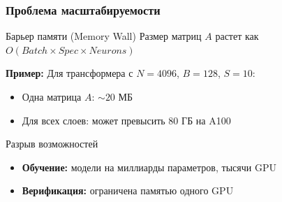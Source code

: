 \begin{frame}
\frametitle{Проблема масштабируемости}

\begin{alertblock}{Барьер памяти (Memory Wall)}
Размер матриц $A$ растет как $O(Batch \times Spec \times Neurons)$
\end{alertblock}

\vspace{0.3cm}

\textbf{Пример:} Для трансформера с $N=4096$, $B=128$, $S=10$:
\begin{itemize}
    \item Одна матрица $A$: $\sim 20$ МБ
    \item Для всех слоев: может превысить 80 ГБ на A100
\end{itemize}

\vspace{0.3cm}

\begin{block}{Разрыв возможностей}
\begin{itemize}
    \item \textbf{Обучение:} модели на миллиарды параметров, тысячи GPU
    \item \textbf{Верификация:} ограничена памятью одного GPU
\end{itemize}
\end{block}

\end{frame}
